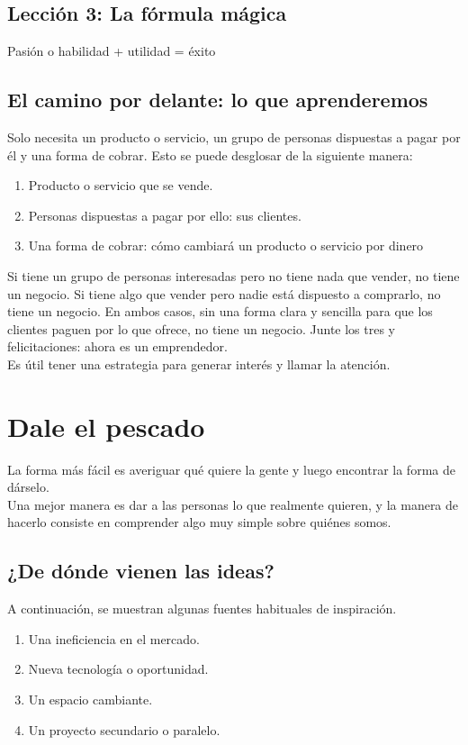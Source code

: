 \documentclass[10pt]{book}
\begin{document}
	\section{Lección 3: La fórmula mágica}	
	Pasión o habilidad + utilidad = éxito

	\section{El camino por delante: lo que aprenderemos}
	Solo necesita un producto o servicio, un grupo de personas dispuestas a pagar por él y una forma de cobrar. Esto se puede desglosar de la siguiente manera:

	\begin{enumerate}[\bfseries 1.]
	    \item Producto o servicio  que se vende.
	    \item Personas dispuestas a pagar por ello: sus clientes.
	    \item Una forma de cobrar: cómo cambiará un producto o servicio por dinero
	\end{enumerate}
	Si tiene un grupo de personas interesadas pero no tiene nada que vender, no tiene un negocio. Si tiene algo que vender pero nadie está dispuesto a comprarlo, no tiene un negocio. En ambos casos, sin una forma clara y sencilla para que los clientes paguen por lo que ofrece, no tiene un negocio. Junte los tres y felicitaciones: ahora es un emprendedor.\\
	Es útil tener una estrategia para generar interés y llamar la atención.

    \chapter{Dale el pescado}
    La forma más fácil es averiguar qué quiere la gente y luego encontrar la forma de dárselo.\\
    Una mejor manera es dar a las personas lo que realmente quieren, y la manera de hacerlo consiste en comprender algo muy simple sobre quiénes somos.
    
	\section{¿De dónde vienen las ideas?}
	A continuación, se muestran algunas fuentes habituales de inspiración.

	\begin{enumerate}[\bfseries 1.]
	    \item Una ineficiencia en el mercado.
	    \item Nueva tecnología o oportunidad.
	    \item Un espacio cambiante.
	    \item Un proyecto secundario o paralelo.
	\end{enumerate}
	    
\end{document}
